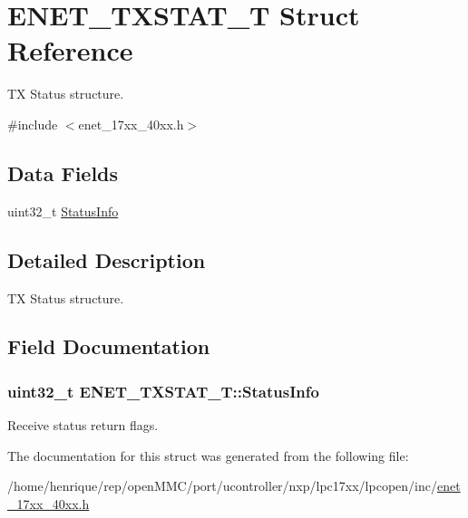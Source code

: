\hypertarget{structENET__TXSTAT__T}{\section{E\-N\-E\-T\-\_\-\-T\-X\-S\-T\-A\-T\-\_\-\-T Struct Reference}
\label{structENET__TXSTAT__T}
}


T\-X Status structure.  




{\ttfamily \#include $<$enet\-\_\-17xx\-\_\-40xx.\-h$>$}

\subsection*{Data Fields}
\begin{DoxyCompactItemize}
\item 
uint32\-\_\-t \hyperlink{structENET__TXSTAT__T_a8b19a43922a609a6b5e477c3d5dae72f}{Status\-Info}
\end{DoxyCompactItemize}


\subsection{Detailed Description}
T\-X Status structure. 

\subsection{Field Documentation}
\hypertarget{structENET__TXSTAT__T_a8b19a43922a609a6b5e477c3d5dae72f}{
\subsubsection[{Status\-Info}]{\setlength{\rightskip}{0pt plus 5cm}uint32\-\_\-t E\-N\-E\-T\-\_\-\-T\-X\-S\-T\-A\-T\-\_\-\-T\-::\-Status\-Info}}\label{structENET__TXSTAT__T_a8b19a43922a609a6b5e477c3d5dae72f}
Receive status return flags. 

The documentation for this struct was generated from the following file\-:\begin{DoxyCompactItemize}
\item 
/home/henrique/rep/open\-M\-M\-C/port/ucontroller/nxp/lpc17xx/lpcopen/inc/\hyperlink{enet__17xx__40xx_8h}{enet\-\_\-17xx\-\_\-40xx.\-h}\end{DoxyCompactItemize}
